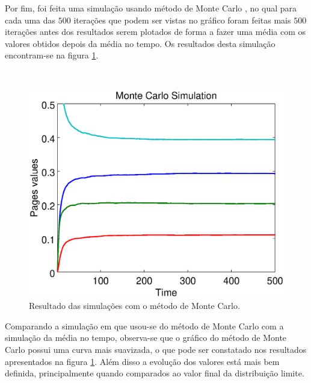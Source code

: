 Por fim, foi feita uma simulação usando método de Monte Carlo \cite{avrachenkov2007monte}, no qual para cada uma das $500$ iterações que podem ser vistas no gráfico foram feitas mais $500$ iterações antes dos resultados serem plotados de forma a fazer uma média com os valores obtidos depois da média no tempo. Os resultados desta simulação encontram-se na figura \ref{montecarlo}.

\
\begin{figure}[!htb]
	\centering
	\includegraphics[scale=0.4]{imagens/montecarlo}
	\caption{Resultado das simulações com o método de Monte Carlo.}
	\label{montecarlo}
\end{figure}

Comparando a simulação em que usou-se do método de Monte Carlo com a simulação da média no tempo, observa-se que o gráfico do método de Monte Carlo possui uma curva mais suavizada, o que pode ser constatado nos resultados apresentados na figura \ref{montecarlo}. Além disso a evolução dos valores está mais bem definida, principalmente quando comparados ao valor final da distribuição limite.


